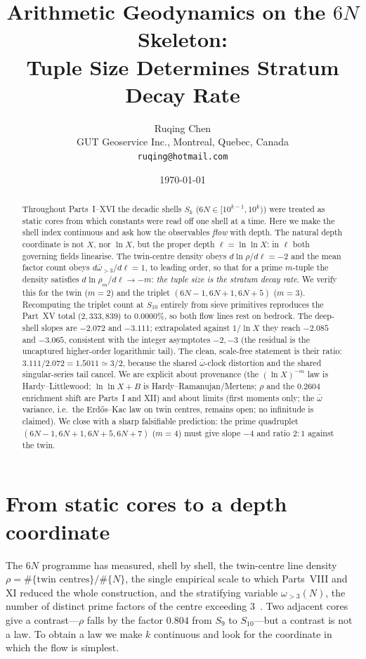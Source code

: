 \documentclass[11pt]{article}
\title{Arithmetic Geodynamics on the $6N$ Skeleton:\\
Tuple Size Determines Stratum Decay Rate}
\author{Ruqing Chen\\
\small GUT Geoservice Inc., Montreal, Quebec, Canada\\
\small \texttt{ruqing@hotmail.com}}
\date{\today}
\begin{document}
\maketitle

\begin{abstract}
Throughout Parts~I--XVI the decadic shells $S_k$ ($6N\in[10^{k-1},10^k)$) were
treated as static cores from which constants were read off one shell at a time.
Here we make the shell index continuous and ask how the observables \emph{flow}
with depth. The natural depth coordinate is not $X$, nor $\ln X$, but the proper
depth $\ell=\ln\ln X$: in $\ell$ both governing fields linearise. The
twin-centre density obeys $d\ln\rho/d\ell=-2$ and the mean factor count obeys
$d\bar\omega_{>3}/d\ell=1$, to leading order, so that for a prime $m$-tuple the
density satisfies $d\ln\rho_m/d\ell\to-m$: \emph{the tuple size is the stratum
decay rate}. We verify this for the twin ($m=2$) and the triplet
$(6N-1,6N+1,6N+5)$ ($m=3$). Recomputing the triplet count at $S_{10}$ entirely
from sieve primitives reproduces the Part~XV total ($2{,}333{,}839$) to
$0.0000\%$, so both flow lines rest on bedrock. The deep-shell slopes are
$-2.072$ and $-3.111$; extrapolated against $1/\ln X$ they reach $-2.085$ and
$-3.065$, consistent with the integer asymptotes $-2,-3$ (the residual is the
uncaptured higher-order logarithmic tail). The clean, scale-free statement is
their ratio: $3.111/2.072=1.5011\simeq3/2$, because the shared $\bar\omega$-clock
distortion and the shared singular-series tail cancel. We are explicit about
provenance (the $(\ln X)^{-m}$ law is Hardy--Littlewood; $\ln\ln X+B$ is
Hardy--Ramanujan/Mertens; $\rho$ and the $0.2604$ enrichment shift are Parts~I and
XII) and about limits (first moments only; the $\bar\omega$ variance, i.e.\ the
Erd\H{o}s--Kac law on twin centres, remains open; no infinitude is claimed). We
close with a sharp falsifiable prediction: the prime quadruplet
$(6N-1,6N+1,6N+5,6N+7)$ ($m=4$) must give slope $-4$ and ratio $2{:}1$ against the
twin.
\end{abstract}

\section{From static cores to a depth coordinate}

The $6N$ programme has measured, shell by shell, the twin-centre line density
$\rho=\#\{\text{twin centres}\}/\#\{N\}$, the single empirical scale to which
Parts~VIII and XI reduced the whole construction, and the stratifying variable
$\omega_{>3}(N)$, the number of distinct prime factors of the centre exceeding
$3$~\cite{ChenI,ChenXI,ChenXII}. Two adjacent cores give a contrast---$\rho$ falls
by the factor $0.804$ from $S_9$ to $S_{10}$---but a contrast is not a law. To
obtain a law we make $k$ continuous and look for the coordinate in which the flow
is simplest.
\end{document}
